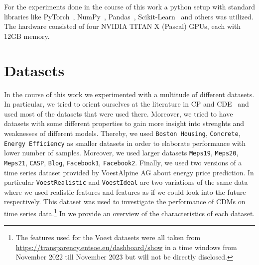 For the experiments done in the course of this work a python setup with standard libraries like PyTorch~\cite{paszke2019pytorch}, NumPy~\cite{harris2020array}, Pandas~\cite{reback2020pandas}, Scikit-Learn~\cite{scikit-learn} and others was utilized. The hardware consisted of four NVIDIA TITAN X (Pascal) GPUs, each with 12GB memory.

\section{Datasets}\label{sec:datasets}

In the course of this work we experimented with a multitude of different datasets. In particular, we tried to orient ourselves at the literature in CP and CDE~\cite{rothfuss2019noise,sesia2021conformal} and used most of the datasets that were used there. Moreover, we tried to have datasets with some different properties to gain more insight into strenghts and weaknesses of different models. Thereby, we used \texttt{Boston Housing}, \texttt{Concrete}, \texttt{Energy Efficiency} as smaller datasets in order to elaborate performance with lower number of samples. Moreover, we used larger datasets \texttt{Meps19}, \texttt{Meps20}, \texttt{Meps21}, \texttt{CASP}, \texttt{Blog}, \texttt{Facebook1}, \texttt{Facebook2}. Finally, we used two versions of a time series dataset provided by VoestAlpine AG about energy price prediction. In particular \texttt{VoestRealistic} and \texttt{VoestIdeal} are two variations of the same data where we used realistic features and features as if we could look into the future respectively. This dataset was used to investigate the performance of CDMs on time series data.\footnote{The features used for the Voest datasets were all taken from \url{https://transparency.entsoe.eu/dashboard/show} in a time windows from November 2022 till November 2023 but will not be directly disclosed.} In  we provide an overview of the characteristics of each dataset.

